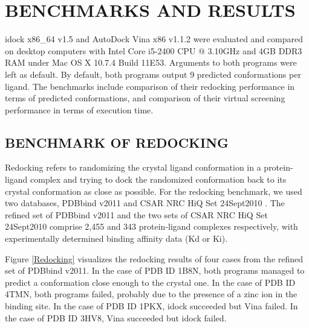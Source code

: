 \documentclass[12pt]{article}
\begin{document}
\section*{\sffamily \Large BENCHMARKS AND RESULTS}

idock x86\_64 v1.5 and AutoDock Vina x86 v1.1.2 were evaluated and compared on desktop computers with Intel Core i5-2400 CPU @ 3.10GHz and 4GB DDR3 RAM under Mac OS X 10.7.4 Build 11E53. Arguments to both programs were left as default. By default, both programs output 9 predicted conformations per ligand. The benchmarks include comparison of their redocking performance in terms of predicted conformations, and comparison of their virtual screening performance in terms of execution time.

\subsection*{\sffamily \large BENCHMARK OF REDOCKING}

Redocking refers to randomizing the crystal ligand conformation in a protein-ligand complex and trying to dock the randomized conformation back to its crystal conformation as close as possible. For the redocking benchmark, we used two databases, PDBbind v2011 \citep{529,530} and CSAR NRC HiQ Set 24Sept2010 \citep{857,960}. The refined set of PDBbind v2011 and the two sets of CSAR NRC HiQ Set 24Sept2010 comprise 2,455 and 343 protein-ligand complexes respectively, with experimentally determined binding affinity data (Kd or Ki).

Figure \ref{Redocking} visualizes the redocking results of four cases from the refined set of PDBbind v2011. In the case of PDB ID 1B8N, both programs managed to predict a conformation close enough to the crystal one. In the case of PDB ID 4TMN, both programs failed, probably due to the presence of a zinc ion in the binding site. In the case of PDB ID 1PKX, idock succeeded but Vina failed. In the case of PDB ID 3HV8, Vina succeeded but idock failed.
\end{document}
